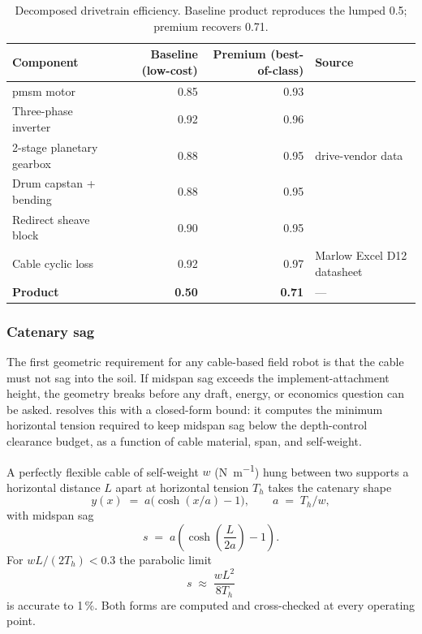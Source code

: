 \documentclass[11pt,a4paper]{article}
\begin{document}
\begin{table}[H]
\centering\small
\caption{Decomposed drivetrain efficiency. Baseline product reproduces the lumped 0.5; premium recovers 0.71.}\label{tab:eta-decomposition}
\begin{tabularx}{\textwidth}{Xrrl}
\toprule
Component & Baseline (low-cost) & Premium (best-of-class) & Source \\
\midrule
\gls{pmsm} motor              & 0.85 & 0.93 & \cite{asabe-ep496} \\
Three-phase inverter           & 0.92 & 0.96 & \cite{asabe-ep496} \\
2-stage planetary gearbox      & 0.88 & 0.95 & drive-vendor data \\
Drum capstan + bending         & 0.88 & 0.95 & \cite{feyrer2015wireropes} \\
Redirect sheave block          & 0.90 & 0.95 & \cite{feyrer2015wireropes} \\
Cable cyclic loss              & 0.92 & 0.97 & Marlow Excel D12 datasheet \\
\midrule
\textbf{Product}               & \textbf{0.50} & \textbf{0.71} & --- \\
\bottomrule
\end{tabularx}
\end{table}

\subsubsection{Catenary sag}\label{sec:catenary}

The first geometric requirement for any cable-based field robot is that the cable must not sag into the soil. If midspan sag exceeds the implement-attachment height, the geometry breaks before any draft, energy, or economics question can be asked.  resolves this with a closed-form bound: it computes the minimum horizontal tension required to keep midspan sag below the depth-control clearance budget, as a function of cable material, span, and self-weight.

A perfectly flexible cable of self-weight $w$ (\si{\newton\per\meter}) hung between two supports a horizontal distance $L$ apart at horizontal tension $T_h$ takes the catenary shape~\cite{irvine1981cables}
\begin{equation}\label{eq:catenary}
y(x) \;=\; a\bigl(\cosh(x/a)-1\bigr), \qquad a \;=\; T_h / w,
\end{equation}
with midspan sag
\begin{equation}\label{eq:sag-exact}
s \;=\; a\!\left(\cosh\!\left(\frac{L}{2a}\right) - 1\right).
\end{equation}
For $w L / (2 T_h) < 0.3$ the parabolic limit
\begin{equation}\label{eq:sag-parabolic}
s \;\approx\; \frac{w L^{2}}{8 T_h}
\end{equation}
is accurate to 1\,\%. Both forms are computed and cross-checked at every operating point.
\end{document}
